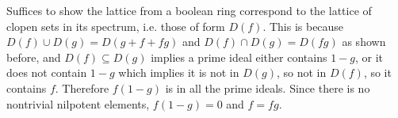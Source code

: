 Suffices to show the lattice from a boolean ring correspond to the lattice of clopen sets in its spectrum, i.e. those of form $D(f)$. This is because $D(f)\cup D(g)=D(g+f+fg)$ and $D(f)\cap D(g)=D(fg)$ as shown before, and $D(f)\subseteq D(g)$ implies a prime ideal either contains $1-g$, or it does not contain $1-g$ which implies it is not in $D(g)$, so not in $D(f)$, so it contains $f$. Therefore $f(1-g)$ is in all the prime ideals. Since there is no nontrivial nilpotent elements, $f(1-g)=0$ and $f=fg$.
